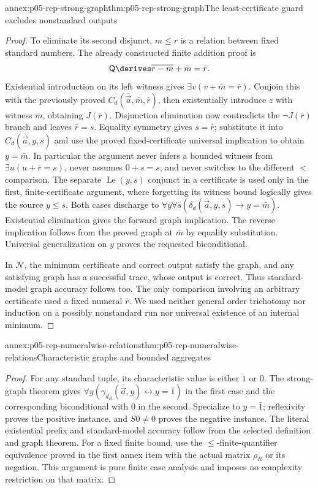 \begin{annexitem}{annex:p05-rep-strong-graph}{thm:p05-rep-strong-graph}{The least-certificate guard excludes nonstandard outputs}
\begin{proof}
To eliminate its second disjunct, \(m\leq r\) is a relation between
fixed standard numbers. The already constructed finite addition proof is
\[
 \mathsf Q\derives
       \overline{r-m}+\bar m=\bar r.
\]
Existential introduction on its left witness gives
\(\exists v(v+\bar m=\bar r)\). Conjoin this with the previously
proved \(C_d(\overline{\vec a},\bar m,\bar r)\), then existentially
introduce \(z\) with witness \(\bar m\), obtaining \(J(\bar r)\).
Disjunction elimination now contradicts the \(\neg J(\bar r)\)
branch and leaves \(\bar r=s\). Equality symmetry gives \(s=\bar r\);
substitute it into \(C_d(\overline{\vec a},y,s)\) and use the proved
fixed-certificate universal implication to obtain \(y=\bar m\).
In particular the argument never infers a bounded witness from
\(\exists u(u+\bar r=s)\), never assumes \(0+s=s\), and never switches
to the different \(<\) comparison. The separate
\(\operatorname{Le}(y,s)\) conjunct in a certificate is used only in
the first, finite-certificate argument, where forgetting its witness bound
logically gives the source \(y\leq s\).
Both cases discharge to
\(\forall y\forall s(\delta_d(\overline{\vec a},y,s)\to y=\bar m)\).
Existential elimination gives the forward graph implication. The reverse
implication follows from the proved graph at \(\bar m\) by equality
substitution. Universal generalization on \(y\) proves the requested
biconditional.

In \(\mathcal N\), the minimum certificate and correct output satisfy
the graph, and any satisfying graph has a successful trace, whose output
is correct. Thus standard-model graph accuracy follows too. The only
comparison involving an arbitrary certificate used a fixed numeral
\(\bar r\). We used neither general order trichotomy nor induction on a
possibly nonstandard run nor universal existence of an internal minimum.
\end{proof}
\end{annexitem}

\begin{annexitem}{annex:p05-rep-numeralwise-relations}{thm:p05-rep-numeralwise-relations}{Characteristic graphs and bounded aggregates}
\begin{proof}
For any standard tuple, its characteristic value is either \(1\) or
\(0\). The strong-graph theorem gives
\(\forall y(\gamma_{d_R}(\overline{\vec a},y)\leftrightarrow y=\bar1)\)
in the first case and the corresponding biconditional with \(0\) in
the second. Specialize to \(y=\bar1\); reflexivity proves the positive
instance, and \(S0\ne0\) proves the negative instance. The literal
existential prefix and standard-model accuracy follow from the selected
definition and graph theorem. For a fixed finite bound, use the
\(\leq\)-finite-quantifier equivalence proved in the first annex item
with the actual matrix \(\rho_R\) or its negation. This argument is
pure finite case analysis and imposes no complexity restriction on that
matrix.
\end{proof}
\end{annexitem}

